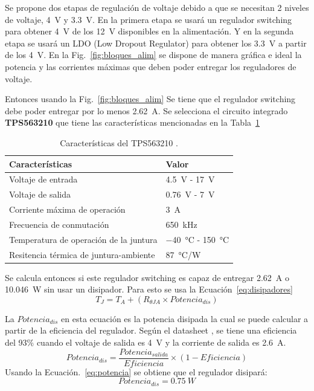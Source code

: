 \newpage

Se propone dos etapas de regulación de voltaje debido a que se necesitan 2 niveles de voltaje, \SI{4}{V} y \SI{3.3}{V}. En la primera etapa se usará un regulador switching para obtener \SI{4}{V} de los \SI{12}{V} disponibles en la alimentación. Y en la segunda etapa se usará un LDO (Low Dropout Regulator) para obtener los \SI{3.3}{V} a partir de los \SI{4}{V}. En la Fig.~\ref{fig:bloques_alim} se dispone de manera gráfica e ideal la potencia y las corrientes máximas que deben poder entregar los reguladores de voltaje.



Entonces usando  la Fig.~\ref{fig:bloques_alim} Se tiene que el regulador switching debe poder entregar por lo menos \SI{2.62}{A}. Se selecciona el circuito integrado \textbf{TPS563210} que tiene las características mencionadas en la Tabla~\ref{diag:Switching}

\bgroup
\def\arraystretch{1.5}%
\begin{table}[htbp!]
\centering
\caption[Características del TPS563210]{Características del TPS563210 \cite{TPS563210}.}
\begin{tabular}{@{}ll@{}}
\toprule
Características & Valor \\ \midrule
Voltaje de entrada & \SI{4.5}{V} - \SI{17}{V} \\
Voltaje de salida & \SI{0.76}{V} - \SI{7}{V} \\
Corriente máxima de operación & \SI{3}{A} \\
Frecuencia de conmutación & \SI{650}{kHz} \\
Temperatura de operación de la juntura & \SI{-40}{\celsius} - \SI{150}{\celsius}\\
Resitencia térmica de juntura-ambiente & \SI{87}{\celsius/W}\\\bottomrule
\end{tabular}
\label{diag:Switching}
\end{table}
\egroup


Se calcula entonces si este regulador switching es capaz de entregar \SI{2.62}{A} o \SI{10.046}{W} sin usar un disipador. Para esto se usa la Ecuación~\ref{eq:disipadores}
\begin{equation}
   T_J=T_A+(R_{\theta JA} \times Potencia_{dis})
   \label{eq:disipadores}
\end{equation}

La $Potencia_{dis}$ en esta ecuación es la potencia disipada la cual se puede calcular a partir de la eficiencia del regulador. Según el datasheet \cite{TPS563210}, se tiene una eficiencia del 93\% cuando el voltaje de salida es \SI{4}{V} y la corriente de salida es \SI{2.6}{A}.
\begin{equation}
    Potencia_{dis}=\frac{Potencia_{salida}}{Eficiencia}\times(1-Eficiencia)
     \label{eq:potencia}
\end{equation}
Usando la Ecuación.~\ref{eq:potencia} se obtiene que el regulador disipará:
 $$Potencia_{dis}=\SI{0.75}{W}$$

